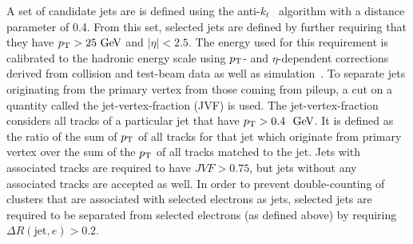 
A set of candidate jets are is defined using the anti-$k_t$~\cite{Cacciari:2008gp} algorithm with a distance parameter of 0.4.
From this set, selected jets are defined by further requiring that they have $\pt>25 \GeV$ and $|\eta|<2.5$.
The energy used for this requirement is calibrated to the hadronic energy scale using $p_{\mathrm{T}}$- and $\eta$-dependent corrections derived from collision and test-beam data as well as simulation~\cite{Aad:2011he}.
To separate jets originating from the primary vertex from those coming from pileup, a cut on a quantity called the jet-vertex-fraction (JVF) is used.
The jet-vertex-fraction considers all tracks of a particular jet that have $\pt>0.4~\GeV{}$.
It is defined as the ratio of the sum of $p_{\mathrm{T}}$ of all tracks for that jet which originate from primary vertex over the sum of the $p_{\mathrm{T}}$ of all tracks matched to the jet. 
Jets with associated tracks are required to have $JVF>0.75$, but jets without any associated tracks are accepted as well.
In order to prevent double-counting of clusters that are associated with selected electrons as jets, selected jets are required to be separated from selected electrons (as defined above) by requiring $\Delta R(\mathrm{jet},e) > 0.2$.

